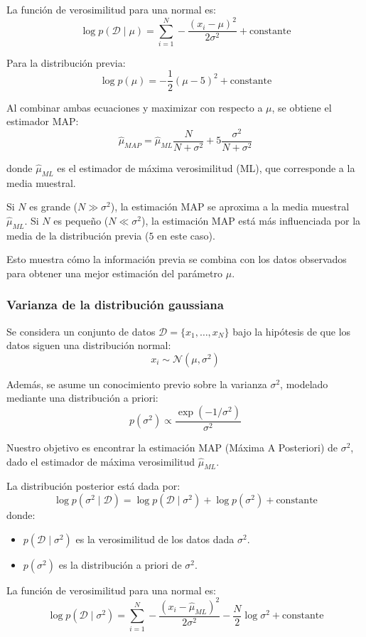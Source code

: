 La función de verosimilitud para una normal es:
$$\log p(\mathcal{D} \mid \mu) = \sum_{i=1}^{N} -\frac{(x_i - \mu)^2}{2\sigma^2} + \text{constante}$$

Para la distribución previa:
$$\log p(\mu) = -\frac{1}{2} (\mu - 5)^2 + \text{constante}$$

Al combinar ambas ecuaciones y maximizar con respecto a $\mu$, se obtiene el estimador MAP:
$$\hat{\mu}_{MAP} = \hat{\mu}_{ML} \frac{N}{N + \sigma^2} + 5 \frac{\sigma^2}{N + \sigma^2}$$

donde $\hat{\mu}_{ML}$ es el estimador de máxima verosimilitud (ML), que corresponde a la media muestral.

Si $N$ es grande ($N \gg \sigma^2$), la estimación MAP se aproxima a la media muestral $\hat{\mu}_{ML}$. Si $N$ es pequeño ($N \ll \sigma^2$), la estimación MAP está más influenciada por la media de la distribución previa ($5$ en este caso).

Esto muestra cómo la información previa se combina con los datos observados para obtener una mejor estimación del parámetro $\mu$.

\subsubsection{Varianza de la distribución gaussiana}
Se considera un conjunto de datos $\mathcal{D} = \{x_1, \dots, x_N\}$ bajo la hipótesis de que los datos siguen una distribución normal:
$$ x_i \sim \mathcal{N}(\mu, \sigma^2)$$

Además, se asume un conocimiento previo sobre la varianza $\sigma^2$, modelado mediante una distribución a priori:
$$ p(\sigma^2) \propto \frac{\exp(-1/\sigma^2)}{\sigma^2}$$

Nuestro objetivo es encontrar la estimación MAP (Máxima A Posteriori) de $\sigma^2$, dado el estimador de máxima verosimilitud $\hat{\mu}_{ML}$.

La distribución posterior está dada por:
$$\log p(\sigma^2 \mid \mathcal{D}) = \log p(\mathcal{D} \mid \sigma^2) + \log p(\sigma^2) + \text{constante}$$
donde:
\begin{itemize}
\item $p(\mathcal{D} \mid \sigma^2)$ es la verosimilitud de los datos dada $\sigma^2$.
\item $p(\sigma^2)$ es la distribución a priori de $\sigma^2$.
\end{itemize}

La función de verosimilitud para una normal es:
$$ \log p(\mathcal{D} \mid \sigma^2) = \sum_{i=1}^{N} -\frac{(x_i - \hat{\mu}_{ML})^2}{2\sigma^2} - \frac{N}{2} \log \sigma^2 + \text{constante}$$

